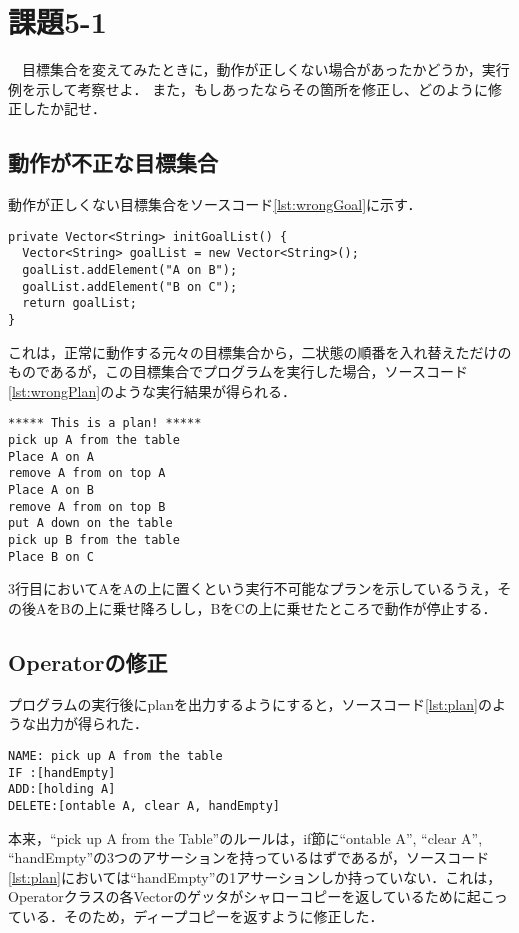 \documentclass{jarticle}
\begin{document}
\section{課題5-1}
\begin{screen}
　目標集合を変えてみたときに，動作が正しくない場合があったかどうか，実行例を示して考察せよ．
また，もしあったならその箇所を修正し、どのように修正したか記せ．
\end{screen}

\subsection{動作が不正な目標集合}
動作が正しくない目標集合をソースコード\ref{lst:wrongGoal}に示す．
  \begin{lstlisting}[caption=Planner.java(一部抜粋),label=lst:wrongGoal]
private Vector<String> initGoalList() {
  Vector<String> goalList = new Vector<String>();
  goalList.addElement("A on B");
  goalList.addElement("B on C");
  return goalList;
}
  \end{lstlisting}
  
これは，正常に動作する元々の目標集合から，二状態の順番を入れ替えただけのものであるが，この目標集合でプログラムを実行した場合，ソースコード\ref{lst:wrongPlan}のような実行結果が得られる．
\newpage
\begin{lstlisting}[caption=実行例(抜粋),label=lst:wrongPlan]
***** This is a plan! *****
pick up A from the table
Place A on A
remove A from on top A
Place A on B
remove A from on top B
put A down on the table
pick up B from the table
Place B on C
\end{lstlisting}

3行目においてAをAの上に置くという実行不可能なプランを示しているうえ，その後AをBの上に乗せ降ろしし，BをCの上に乗せたところで動作が停止する．

\subsection{Operatorの修正}
\label{sec:1Operator}
プログラムの実行後にplanを出力するようにすると，ソースコード\ref{lst:plan}のような出力が得られた．
\begin{lstlisting}[caption=実行例(抜粋),label=lst:plan]
NAME: pick up A from the table
IF :[handEmpty]
ADD:[holding A]
DELETE:[ontable A, clear A, handEmpty]
\end{lstlisting}

本来，``pick up A from the Table''のルールは，if節に``ontable A'', ``clear A'', ``handEmpty''の3つのアサーションを持っているはずであるが，ソースコード\ref{lst:plan}においては``handEmpty''の1アサーションしか持っていない．これは，Operatorクラスの各Vectorのゲッタがシャローコピーを返しているために起こっている．そのため，ディープコピーを返すように修正した．
\end{document}
